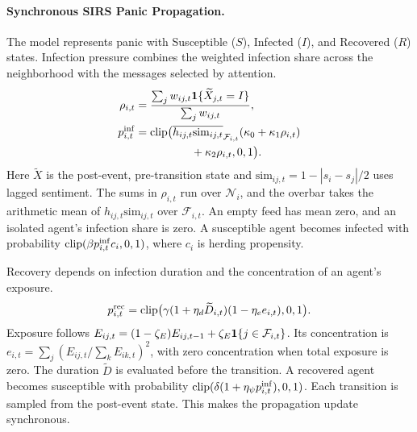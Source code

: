 \paragraph{Synchronous SIRS Panic Propagation.} The model represents panic with Susceptible ($S$), Infected ($I$), and Recovered ($R$) states. Infection pressure combines the weighted infection share across the neighborhood with the messages selected by attention.
\begin{equation}
\begin{split}\rho_{i,t}&=\frac{\sum_j w_{ij,t}\mathbf{1}\{\widetilde X_{j,t}=I\}}{\sum_jw_{ij,t}},\\p^{\rm inf}_{i,t}&=\operatorname{clip}\bigl(\overline{h_{ij,t}\mathrm{sim}_{ij,t}}_{\mathcal F_{i,t}}(\kappa_0+\kappa_1\rho_{i,t})\\&\hspace{5em}+\kappa_2\rho_{i,t},0,1\bigr).\end{split}
  \label{eq:infection_prob}
\end{equation}
Here $\widetilde X$ is the post-event, pre-transition state and $\mathrm{sim}_{ij,t}=1-|s_i-s_j|/2$ uses lagged sentiment. The sums in $\rho_{i,t}$ run over $\mathcal N_i$, and the overbar takes the arithmetic mean of $h_{ij,t}\mathrm{sim}_{ij,t}$ over $\mathcal F_{i,t}$. An empty feed has mean zero, and an isolated agent's infection share is zero. A susceptible agent becomes infected with probability $\operatorname{clip}(\beta p^{\rm inf}_{i,t}c_i,0,1)$, where $c_i$ is herding propensity.

Recovery depends on infection duration and the concentration of an agent's exposure.
\begin{equation}
p^{\rm rec}_{i,t}=\operatorname{clip}\bigl(\gamma(1+\eta_d\widetilde D_{i,t})(1-\eta_e e_{i,t}),0,1\bigr).
  \label{eq:recovery_prob}
\end{equation}
Exposure follows $E_{ij,t}=(1-\zeta_E)E_{ij,t-1}+\zeta_E\mathbf{1}\{j\in\mathcal F_{i,t}\}$. Its concentration is $e_{i,t}=\sum_j(E_{ij,t}/\sum_kE_{ik,t})^2$, with zero concentration when total exposure is zero. The duration $\widetilde D$ is evaluated before the transition. A recovered agent becomes susceptible with probability $\operatorname{clip}(\delta(1+\eta_\psi p^{\rm inf}_{i,t}),0,1)$. Each transition is sampled from the post-event state. This makes the propagation update synchronous.

